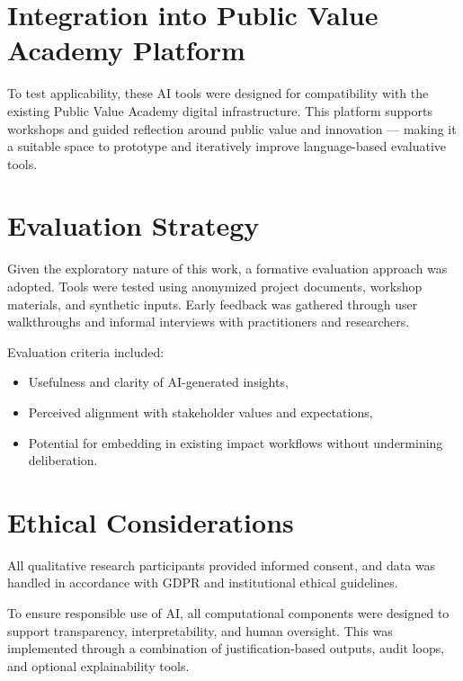 \section{Integration into Public Value Academy Platform}\label{sec:integration-into-public-value-academy-platform}

To test applicability, these AI tools were designed for compatibility with the existing Public Value Academy digital infrastructure.
This platform supports workshops and guided reflection around public value and innovation — making it a suitable space to prototype and iteratively improve language-based evaluative tools.

\section{Evaluation Strategy}\label{sec:evaluation-strategy}

Given the exploratory nature of this work, a formative evaluation approach was adopted.
Tools were tested using anonymized project documents, workshop materials, and synthetic inputs.
Early feedback was gathered through user walkthroughs and informal interviews with practitioners and researchers.

Evaluation criteria included:

\begin{itemize}
    \item Usefulness and clarity of AI-generated insights,
    \item Perceived alignment with stakeholder values and expectations,
    \item Potential for embedding in existing impact workflows without undermining deliberation.
\end{itemize}

\section{Ethical Considerations}\label{sec:ethical-considerations}

All qualitative research participants provided informed consent, and data was handled in accordance with GDPR and institutional ethical guidelines.

To ensure responsible use of AI, all computational components were designed to support transparency, interpretability, and human oversight.
This was implemented through a combination of justification-based outputs, audit loops, and optional explainability tools.


